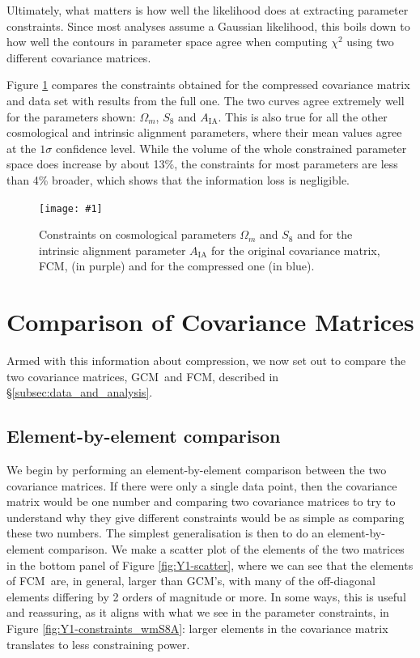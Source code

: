 \documentclass[twocolumn,nofootinbib]{\docclass}
\newcommand{\sfig}[2]{
	\texttt{[image: \#1]}
}
\newcommand{\Sfig}[2]{
	\begin{figure}[thbp]
		\sfig{../figures/#1.pdf}{\columnwidth}
		\caption{{\small #2}}
		\label{fig:#1}
	\end{figure}
}
\newcommand{\rf}[1]{Figure \ref{fig:#1}}
\newcommand{\rssec}[1]{\S\ref{subsec:#1}}
\newcommand\full{FCM}
\newcommand\gaussian{GCM}
\begin{document}
	Ultimately, what matters is how well the likelihood does at extracting parameter constraints. Since most analyses assume a Gaussian likelihood, this boils down to how well the contours in parameter space agree when computing $\chi^2$ using two different covariance matrices.	
	
	\rf{Comp2pt-constraints_wmS8A} compares the constraints obtained for the compressed covariance matrix and data set with results from the full one. The two curves agree extremely well for the parameters shown: $\Omega_m$, $S_8$ and $A_{\mathrm{IA}}$. This is also true for all the other cosmological and intrinsic alignment parameters, where their mean values agree at the $1 \sigma$ confidence level. While the volume of the whole constrained parameter space does increase by about 13\%, the constraints for most parameters are less than 4\% broader, which shows that the information loss is negligible. 
	
	\Sfig{Comp2pt-constraints_wmS8A}{Constraints on cosmological parameters $\Omega_m$ and $S_8$ and for the intrinsic alignment parameter $A_{\mathrm{IA}}$ for the original covariance matrix, \full, (in purple) and for the compressed one (in blue).}
	
	\section{Comparison of Covariance Matrices}
	\label{sec:comparison_matrices}
	
	Armed with this information about compression, we now set out to compare the two covariance matrices, \gaussian\ and \full, described in \rssec{data_and_analysis}. 
	
	\subsection{Element-by-element comparison}
	\label{subsec:compare_one-one}
	
	We begin by performing an element-by-element comparison between the two covariance matrices. If there were only a single data point, then the covariance matrix would be one number and comparing two covariance matrices to try to understand why they give different constraints would be as simple as comparing these two numbers.  The simplest generalisation is then to do an element-by-element comparison. We make a scatter plot of the elements of the two matrices in the bottom panel of \rf{Y1-scatter}, where we can see that the elements of \full\ are, in general, larger than \gaussian's, with many of the off-diagonal elements differing by 2 orders of magnitude or more.
	In some ways, this is useful and reassuring, as it aligns with what we see in the parameter constraints, in \rf{Y1-constraints_wmS8A}: larger elements in the covariance matrix translates to less constraining power. 
	
\end{document}
